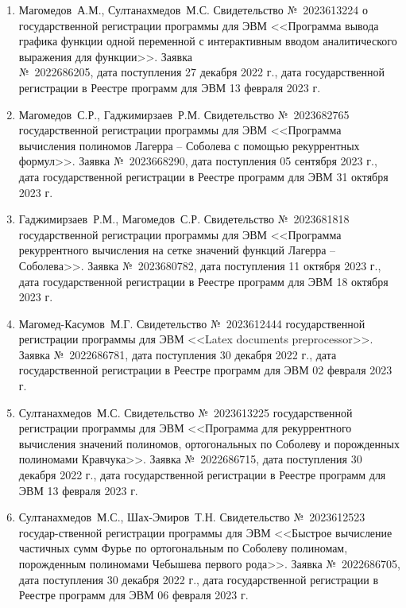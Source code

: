 \begin{enumerate}

    \item Магомедов~А.М., Султанахмедов~М.С. Свидетельство №~2023613224 о государственной регистрации программы для ЭВМ <<Программа вывода графика функции одной переменной с интерактивным вводом аналитического выражения для функции>>. Заявка \\№~2022686205, дата поступления 27 декабря 2022 г., дата государственной регистрации в Реестре программ для ЭВМ 13 февраля 2023 г.  
    
    \item
    {Магомедов~С.Р., Гаджимирзаев~Р.М.} 
    Свидетельство №~2023682765 государственной регистрации программы для ЭВМ <<Программа вычисления полиномов Лагерра -- Соболева с помощью рекуррентных формул>>. Заявка №~2023668290, дата поступления 05 сентября 2023 г., дата государственной регистрации в Реестре программ для ЭВМ 31 октября 2023 г.

    \item
    {Гаджимирзаев~Р.М., Магомедов~С.Р.} 
    Свидетельство №~2023681818 государственной регистрации программы для ЭВМ <<Программа рекуррентного вычисления на сетке значений функций Лагерра -- Соболева>>. Заявка №~2023680782, дата поступления 11 октября 2023 г., дата государственной регистрации в Реестре программ для ЭВМ 18 октября 2023 г.

    \item
    {Магомед-Касумов~М.Г.}
    Свидетельство №~2023612444 государственной регистрации программы для ЭВМ <<Latex documents preprocessor>>. Заявка №~2022686781, дата поступления 30 декабря 2022 г., дата государственной регистрации в Реестре программ для ЭВМ 02 февраля 2023 г.

    \item
    {Султанахмедов~М.С.}
    Свидетельство №~2023613225 государственной регистрации программы для ЭВМ <<Программа для рекуррентного вычисления значений полиномов, ортогональных по Соболеву и порожденных полиномами Кравчука>>. Заявка №~2022686715, дата поступления 30 декабря 2022 г., дата государственной регистрации в Реестре программ для ЭВМ 13 февраля 2023 г.

    \item
    {Султанахмедов~М.С., Шах-Эмиров~Т.Н.}
    Свидетельство №~2023612523 государ-\linebreak ственной регистрации программы для ЭВМ <<Быстрое вычисление частичных сумм Фурье по ортогональным по Соболеву полиномам, порожденным полиномами Чебышева первого рода>>. Заявка №~2022686705, дата поступления 30 декабря 2022 г., дата государственной регистрации в Реестре программ для ЭВМ 06 февраля 2023 г.

\end{enumerate}

